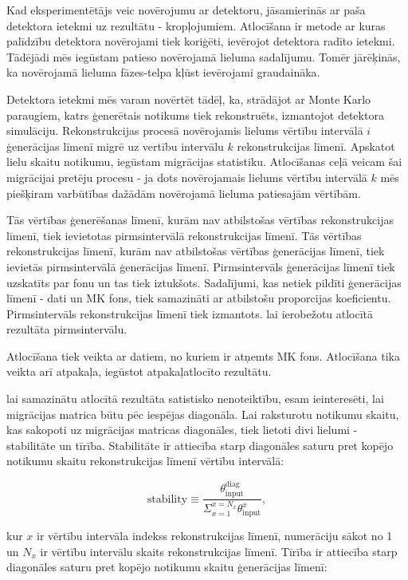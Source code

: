 Kad eksperimentētājs veic novērojumu ar detektoru, jāsamierinās ar paša detektora ietekmi uz rezultātu - kropļojumiem. \gls{Atlocīšana} ir metode ar kuras palīdzību detektora novērojami tiek koriģēti, ievērojot detektora radīto ietekmi. Tādējādi mēs iegūstam patieso novērojamā lieluma sadalījumu. Tomēr jārēķinās, ka novērojamā lieluma fāzes-telpa kļūst ievērojami graudaināka. 

Detektora ietekmi mēs varam novērtēt tādēļ, ka, strādājot ar Monte Karlo paraugiem, katrs ģenerētais notikums tiek rekonstruēts, izmantojot detektora simulāciju. Rekonstrukcijas procesā novērojamis lielums vērtību intervālā $i$ ģenerācijas līmenī migrē uz vertību intervālu $k$ rekonstrukcijas līmenī. Apskatot lielu skaitu notikumu, iegūstam migrācijas statistiku. Atlocīšanas ceļā veicam šai migrācijai pretēju procesu - ja dots novērojamais lielums vērtību intervālā $k$ mēs piešķiram varbūtības dažādām novērojamā lieluma patiesajām vērtībām.

Tās \pullangle vērtības ģenerēšanas līmenī, kurām nav atbilstošas vērtības rekonstrukcijas līmenī, tiek ievietotas pirmsintervālā rekonstrukcijas līmenī. Tās \pullangle vērtības rekonstrukcijas līmenī, kurām nav atbilstošas vērtības ģenerācijas līmenī, tiek ievietās pirmsintervālā ģenerācijas līmenī. Pirmsintervāls ģenerācijas līmenī tiek uzskatīts par fonu un tas tiek iztukšots. Sadalījumi, kas netiek pildīti ģenerācijas līmenī - dati un MK fons, tiek samazināti ar atbilstošu proporcijas koeficientu. Pirmsintervāls rekonstrukcijas līmenī tiek izmantots. lai ierobežotu atlocītā rezultāta pirmsintervālu. 

Atlocīšana tiek veikta ar datiem, no kuriem ir atņemts MK fons. Atlocīšana tika veikta arī atpakaļa, iegūstot atpakaļatlocīto rezultātu. 

lai samazinātu atlocītā rezultāta satistisko nenoteiktību, esam ieinteresēti, lai migrācijas matrica būtu pēc iespējas diagonāla. Lai raksturotu notikumu skaitu, kas sakopoti uz migrācijas matricas diagonāles, tiek lietoti divi lielumi - stabilitāte un tīrība. Stabilitāte ir attiecība starp diagonāles saturu pret kopējo notikumu skaitu rekonstrukcijas līmenī vērtību intervālā:

\begin{equation}
  \text{stability}\equiv\frac{\theta^{\text{diag}}_{\text{input}}}{\Sigma_{x=1}^{x=N_{x}}\theta^{x}_{\text{input}}},
\end{equation}

kur $x$ ir vērtību intervāla indekss rekonstrukcijas līmenī, numerāciju sākot no 1 un $N_{x}$ ir vērtību intervālu skaits rekonstrukcijas līmenī. Tīrība ir attiecība starp diagonāles saturu pret kopējo notikumu skaitu ģenerācijas līmenī:

